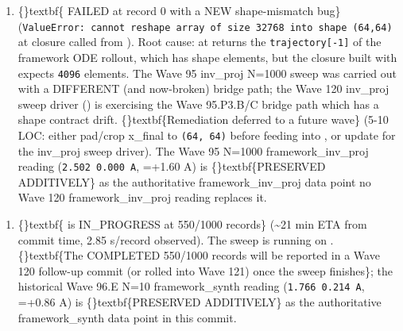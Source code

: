 \documentclass{article}
\begin{document}
\begin{enumerate}
\item \{\}textbf\{ FAILED at record 0 with a NEW shape-mismatch bug\} (\texttt{ValueError: cannot reshape array of size 32768 into shape (64,64)} at   closure called from  ). Root cause:  at  returns the \texttt{trajectory[-1]} of the framework ODE rollout, which has shape  elements, but the  closure built with  expects \texttt{4096} elements. The Wave 95 inv\_proj N=1000 sweep was carried out with a DIFFERENT (and now-broken) bridge path; the Wave 120 inv\_proj sweep driver () is exercising the Wave 95.P3.B/C bridge path which has a shape contract drift. \{\}textbf\{Remediation deferred to a future wave\} (5-10 LOC: either pad/crop x\_final to \texttt{(64, 64)} before feeding into , or update  for the inv\_proj sweep driver). The Wave 95 N=1000 framework\_inv\_proj reading (\texttt{2.502  0.000 A}, =+1.60 A) is \{\}textbf\{PRESERVED ADDITIVELY\} as the authoritative framework\_inv\_proj data point  no Wave 120 framework\_inv\_proj reading replaces it.
\end{enumerate}
\begin{enumerate}
\item \{\}textbf\{ is IN\_PROGRESS at 550/1000 records\} (\textasciitilde{}21 min ETA from commit time, 2.85 s/record observed). The sweep is running on . \{\}textbf\{The COMPLETED 550/1000 records will be reported in a Wave 120 follow-up commit (or rolled into Wave 121) once the sweep finishes\}; the historical Wave 96.E N=10 framework\_synth reading (\texttt{1.766  0.214 A}, =+0.86 A) is \{\}textbf\{PRESERVED ADDITIVELY\} as the authoritative framework\_synth data point in this commit.
\end{enumerate}
\end{document}
